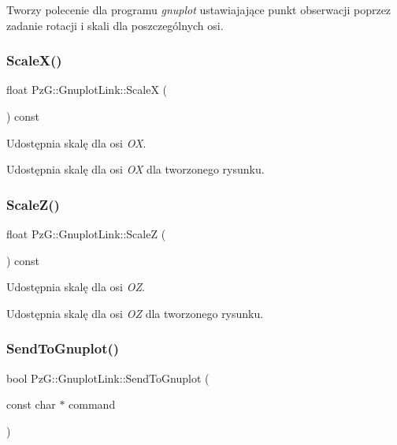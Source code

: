 Tworzy polecenie dla programu {\itshape gnuplot} ustawiajające punkt obserwacji poprzez zadanie rotacji i skali dla poszczególnych osi. \mbox{\label{class_pz_g_1_1_gnuplot_link_a1ffc96315a688f5ed0cd9d772ae1a1df}} 
\subsubsection{\texorpdfstring{Scale\+X()}{ScaleX()}}
{\footnotesize\ttfamily float Pz\+G\+::\+Gnuplot\+Link\+::\+ScaleX (\begin{DoxyParamCaption}{ }\end{DoxyParamCaption}) const\hspace{0.3cm}{\ttfamily [inline]}}



Udostępnia skalę dla osi {\itshape OX}. 

Udostępnia skalę dla osi {\itshape OX} dla tworzonego rysunku. \mbox{\label{class_pz_g_1_1_gnuplot_link_ac8f652a7f9a44568b00069e63ffdaa2e}} 
\subsubsection{\texorpdfstring{Scale\+Z()}{ScaleZ()}}
{\footnotesize\ttfamily float Pz\+G\+::\+Gnuplot\+Link\+::\+ScaleZ (\begin{DoxyParamCaption}{ }\end{DoxyParamCaption}) const\hspace{0.3cm}{\ttfamily [inline]}}



Udostępnia skalę dla osi {\itshape OZ}. 

Udostępnia skalę dla osi {\itshape OZ} dla tworzonego rysunku. \mbox{\label{class_pz_g_1_1_gnuplot_link_acf0c0bf937eb87f9c14dedf2f01780bc}} 
\subsubsection{\texorpdfstring{Send\+To\+Gnuplot()}{SendToGnuplot()}}
{\footnotesize\ttfamily bool Pz\+G\+::\+Gnuplot\+Link\+::\+Send\+To\+Gnuplot (\begin{DoxyParamCaption}\item[{const char $\ast$}]{command }\end{DoxyParamCaption})\hspace{0.3cm}{\ttfamily [protected]}}

